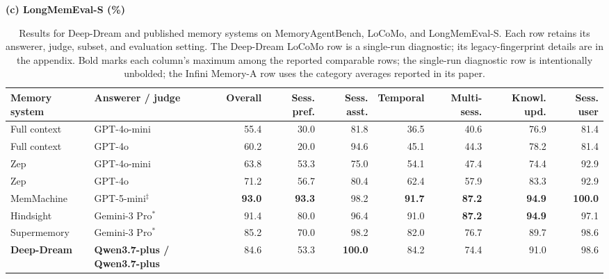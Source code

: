 \begin{table}[t]
\vspace{3pt}
{\footnotesize\textbf{(c) LongMemEval-S (\%)}}\\[1.5pt]
{\tiny\setlength{\tabcolsep}{0pt}\begin{tabular*}{\textwidth}{@{\extracolsep{\fill}}>{\raggedright\arraybackslash}p{}>{\raggedright\arraybackslash}p{}rrrrrrr@{}}
\toprule
Memory system & Answerer / judge & Overall & Sess. pref. & Sess. asst. & Temporal & Multi-sess. & Knowl. upd. & Sess. user \\
\midrule
Full context & GPT-4o-mini & 55.4 & 30.0 & 81.8 & 36.5 & 40.6 & 76.9 & 81.4 \\
Full context & GPT-4o & 60.2 & 20.0 & 94.6 & 45.1 & 44.3 & 78.2 & 81.4 \\
\midrule
Zep & GPT-4o-mini & 63.8 & 53.3 & 75.0 & 54.1 & 47.4 & 74.4 & 92.9 \\
Zep & GPT-4o & 71.2 & 56.7 & 80.4 & 62.4 & 57.9 & 83.3 & 92.9 \\
\rowcolor{green!9}
MemMachine & GPT-5-mini$^\ddagger$ & \textbf{93.0} & \textbf{93.3} & 98.2 & \textbf{91.7} & \textbf{87.2} & \textbf{94.9} & \textbf{100.0} \\
\rowcolor{green!9}
Hindsight & Gemini-3 Pro$^\ast$ & 91.4 & 80.0 & 96.4 & 91.0 & \textbf{87.2} & \textbf{94.9} & 97.1 \\
\rowcolor{green!9}
Supermemory & Gemini-3 Pro$^\ast$ & 85.2 & 70.0 & 98.2 & 82.0 & 76.7 & 89.7 & 98.6 \\
\midrule
\rowcolor{blue!9}
\textbf{Deep-Dream} & \textbf{Qwen3.7-plus / Qwen3.7-plus} & 84.6 & 53.3 & \textbf{100.0} & 84.2 & 74.4 & 91.0 & 98.6 \\
\bottomrule
\end{tabular*}}
\caption{Results for Deep-Dream and published memory systems on MemoryAgentBench, LoCoMo, and LongMemEval-S. Each row retains its answerer, judge, subset, and evaluation setting. The Deep-Dream LoCoMo row is a single-run diagnostic; its legacy-fingerprint details are in the appendix. Bold marks each column's maximum among the reported comparable rows; the single-run diagnostic row is intentionally unbolded; the Infini Memory-A row uses the category averages reported in its paper.}
\label{tab:main-cross-system}
\end{table}


